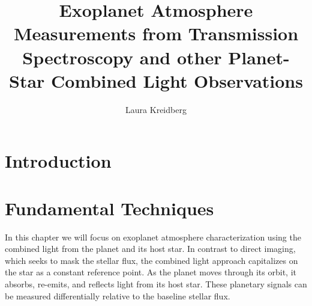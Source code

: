 \documentclass[graybox,natbib,nosecnum]{svmult}
\begin{document}
\title*{Exoplanet Atmosphere Measurements from Transmission Spectroscopy and other Planet-Star Combined Light Observations}
\author{Laura Kreidberg}
%
%
\maketitle




\section{Introduction }



\section{Fundamental Techniques} 
In this chapter we will focus on exoplanet atmosphere characterization using the combined light from the planet and its host star. In contrast to direct imaging, which seeks to mask the stellar flux, the combined light approach capitalizes on the star as a constant reference point. As the planet moves through its orbit, it absorbs, re-emits, and reflects light from its host star. These planetary signals can be measured differentially relative to the baseline stellar flux.
\end{document}
